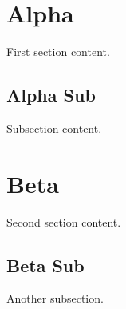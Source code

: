 \documentclass{article}
\begin{document}
\section{Alpha}
First section content.

\subsection{Alpha Sub}
Subsection content.

\section{Beta}
Second section content.

\subsection{Beta Sub}
Another subsection.
\end{document}
